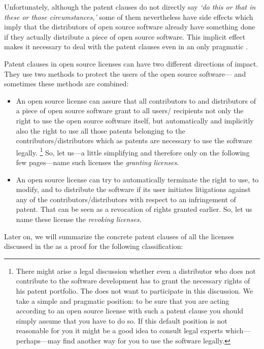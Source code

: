 Unfortunately, although the patent clauses do not directly say \emph{`do this or
that in these or those circumstances,'} some of them nevertheless have side
effects which imply that the distributors of open source software already
have something done if they actually distribute a piece of open
source software. This implicit effect makes it necessary to deal with the patent
clauses even in an only pragmatic \oslic.

Patent clauses in open source licenses can have two different directions of
impact. They use two methods to protect the users of the open source software---%
and sometimes these methods are combined:

\begin{itemize}
  \item An open source license can assure that all contributors to and
  distributors of a piece of open source software grant to all users/%
  recipients not only the right to use the open source software itself, but
  automatically and implicitly also the right to use all those patents 
  belonging to the contributors/distributors which as patents are necessary
  to use the software legally.%
    \footnote{There might arise a legal discussion
    whether even a distributor who does not contribute to the software development
    has to grant the necessary rights of his patent
    portfolio. The \oslic{} does not want to participate in this discussion. We take a
    simple and pragmatic position: to be sure that you are acting according to
    an open source license with such a patent clause you should simply assume that
    you have to do so. If this default position is not reasonable for you it might
    be a good idea to consult legal experts which---perhaps---may find another
    way for you to use the software legally.} 
  So, let us---a little simplifying and therefore only on the following few
  pages---name such licenses the \emph{granting licenses}.
  \item An open source license can try to automatically terminate the
  right to use, to modify, and to distribute the software if its user initiates
  litigations against any of the contributors/distributors with respect to an
  infringement of patent. That can be seen as a revocation of rights granted 
  earlier. So, let us name these license the \emph{revoking licenses.}
\end{itemize}

Later on, we will summarize the concrete patent clauses of all the licenses
discussed in the \oslic{} as a proof for the following classification:

